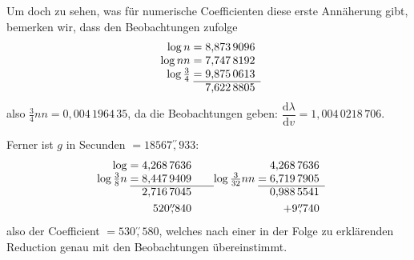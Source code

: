 \par\noindent\hspace*{\parindent}Um doch zu sehen, was für numerische Coefficienten diese erste
Annäherung gibt, bemerken wir, dass den Beobachtungen zufolge
\[
\begin{array}{r@{\;}c@{\;}r}
\log n&=&8{,}873\,9096\\
\log nn&=&7{,}747\,8192\\
\log\tfrac34&=&9{,}875\,0613\\\cline{2-3}
&&7{,}622\,8805
\end{array}
\]
\noindent also \(\tfrac34nn=0{,}004\,1964\,35\), da die Beobachtungen geben:
\(\dfrac{\mathrm{d}\lambda}{\mathrm{d}v}=1{,}004\,0218\,706\).

\par\noindent\hspace*{\parindent}Ferner ist \(g\) in Secunden \(=18567\overset{\prime\prime}{,}933\):
\[
\begin{array}{r@{\;}c@{\;}r@{\qquad}r@{\;}c@{\;}r}
\log&=&4{,}268\,7636&&&4{,}268\,7636\\
\log\tfrac38n&=&8{,}447\,9409&\log\tfrac{3}{32}nn&=&6{,}719\,7905\\\cline{2-3}\cline{5-6}
&&2{,}716\,7045&&&0{,}988\,5541\\[3pt]
&&520\overset{\prime\prime}{,}840&&&+9\overset{\prime\prime}{,}740
\end{array}
\]
\noindent also der Coefficient \(=530\overset{\prime\prime}{,}580\), welches nach einer
in der Folge zu erklärenden Reduction genau mit den Beobachtungen übereinstimmt.
\clearpage
\endgroup
